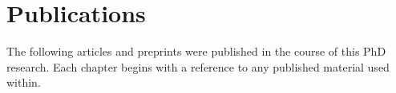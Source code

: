 \chapter*{Publications}

The following articles and preprints were published in the course of this PhD research. Each chapter begins with a reference to any published material used within.


\begin{refsection}[ownpubs]
    \small
    \nocite{*} %
    \printbibliography[heading=none]
\end{refsection}
